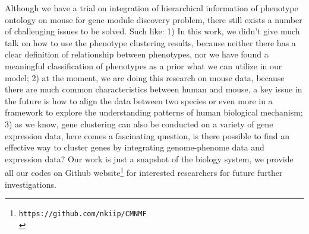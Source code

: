 \documentclass{bmcart}
\begin{document}
Although we have a trial on integration of hierarchical information of phenotype ontology on mouse for gene module discovery problem, there still exists a number of challenging issues to be solved. Such like: 1) In this work, we didn't give much talk on how to use the phenotype clustering results, because neither there has a clear definition of relationship between phenotypes, nor we have found a meaningful classification of phenotypes as a prior what we can utilize in our model; 2) at the moment, we are doing this research on mouse data, because there are much common characteristics between human and mouse, a key issue in the future is how to align the data between two species or even more in a framework to explore the understanding patterns of human biological mechanism; 3) as we know, gene clustering can also be conducted on a variety of gene expression data, here comes a fascinating question, is there possible to find an effective way to cluster genes by integrating genome-phenome data and expression data? Our work is just a snapshot of the biology system, we provide all our codes on Github website\footnote{\texttt{https://github.com/nkiip/CMNMF}\\} for interested researchers for future further investigations.

\end{document}

